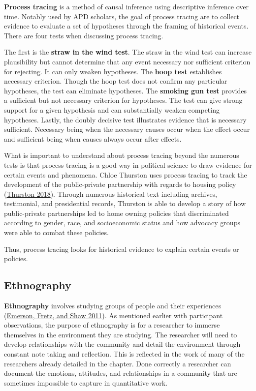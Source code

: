 \documentclass{book}
\begin{document}
\textbf{Process tracing} is a method of causal inference using descriptive
inference over time. Notably used by APD scholars, the goal of process tracing
are to collect evidence to evaluate a set of hypotheses through the framing of
historical events. There are four tests when discussing process tracing.

The first is the \textbf{straw in the wind test}. The straw in the wind test
can increase plausibility but cannot determine that any event necessary nor
sufficient criterion for rejecting. It can only weaken hypotheses. The
\textbf{hoop test} establishes necessary criterion. Though the hoop test does
not confirm any particular hypotheses, the test can eliminate hypotheses. The
\textbf{smoking gun test} provides a sufficient but not necessary criterion
for hypotheses. The test can give strong support for a given hypothesis and
can substantially weaken competing hypotheses. Lastly, the doubly decisive
test illustrates evidence that is necessary sufficient. Necessary being when
the necessary causes occur when the effect occur and sufficient being when
causes always occur after effects.

What is important to understand about process tracing beyond the numerous
tests is that process tracing is a good way in political science to draw
evidence for certain events and phenomena. Chloe Thurston uses process tracing
to track the development of the public-private partnership with regards to
housing policy (\protect\hyperlink{ref-thurston2018a}{Thurston 2018}). Through
numerous historical text including archives, testimonial, and presidential
records, Thurston is able to develop a story of how public-private
partnerships led to home owning policies that discriminated according to
gender, race, and socioeconomic status and how advocacy groups were able to
combat these policies.

Thus, process tracing looks for historical evidence to explain certain events
or policies.

\hypertarget{ethnography}{%
\subsection{Ethnography}\label{ethnography}}

\textbf{Ethnography} involves studying groups of people and their experiences
(\protect\hyperlink{ref-emerson2011a}{Emerson, Fretz, and Shaw 2011}). As
mentioned earlier with participant observations, the purpose of ethnography is
for a researcher to immerse themselves in the environment they are studying.
The researcher will need to develop relationships with the community and
detail the environment through constant note taking and reflection. This is
reflected in the work of many of the researchers already detailed in the
chapter. Done correctly a researcher can document the emotions, attitudes, and
relationships in a community that are sometimes impossible to capture in
quantitative work.
\end{document}
